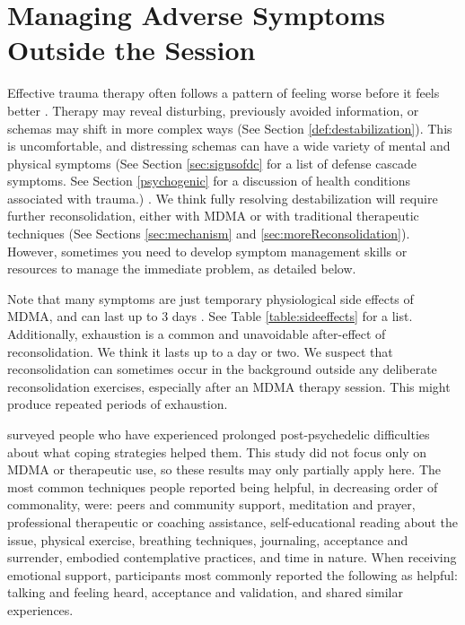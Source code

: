 \documentclass[12pt,letterpaper]{book}
\begin{document}
\section{Managing Adverse Symptoms Outside the Session}
\label{sectionManagement}
Effective trauma therapy often follows a pattern of feeling worse before it feels better \cite{olthofDestabilization}. Therapy may reveal disturbing, previously avoided information, or schemas may shift in more complex ways (See Section \ref{def:destabilization}). This is uncomfortable, and distressing schemas can have a wide variety of mental and physical symptoms (See Section \ref{sec:signsofdc} for a list of defense cascade symptoms. See Section \ref{psychogenic} for a discussion of health conditions associated with trauma.) \cite{kroenkeSomatic,henningsenSomatic}. We think fully resolving destabilization will require further reconsolidation, either with MDMA or with traditional therapeutic techniques (See Sections \ref{sec:mechanism} and \ref{sec:moreReconsolidation}). However, sometimes you need to develop symptom management skills or resources to manage the immediate problem, as detailed below.

Note that many symptoms are just temporary physiological side effects of MDMA, and can last up to 3 days \cite{liechtiGender}. See Table \ref{table:sideeffects} for a list. Additionally, exhaustion is a common and unavoidable after-effect of reconsolidation. We think it lasts up to a day or two. We suspect that reconsolidation can sometimes occur in the background outside any deliberate reconsolidation exercises, especially after an MDMA therapy session. This might produce repeated periods of exhaustion.

\textcite{robinson2024coming} surveyed people who have experienced prolonged post-psychedelic difficulties about what coping strategies helped them. This study did not focus only on MDMA or therapeutic use, so these results may only partially apply here. The most common techniques people reported being helpful, in decreasing order of commonality, were: peers and community support, meditation and prayer, professional therapeutic or coaching assistance, self-educational reading about the issue, physical exercise, breathing techniques, journaling, acceptance and surrender, embodied contemplative practices, and time in nature. When receiving emotional support, participants most commonly reported the following as helpful: talking and feeling heard, acceptance and validation, and shared similar experiences.
\end{document}
